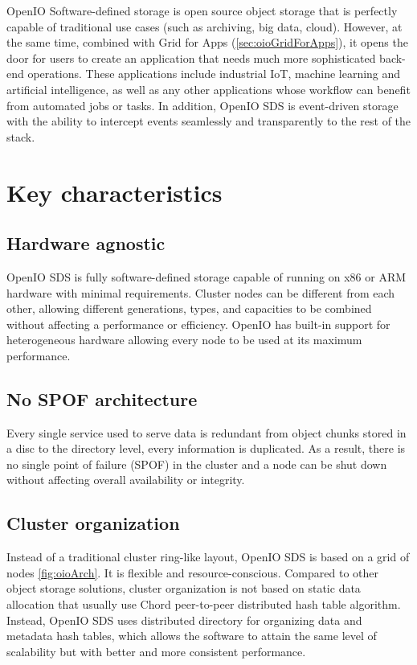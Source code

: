     OpenIO Software-defined storage is open source object storage that is perfectly capable of traditional use cases (such as archiving, big data, cloud). However, at the same time, combined with Grid for Apps (\ref{sec:oioGridForApps}), it opens the door for users to create an application that needs much more sophisticated back-end operations. These applications include industrial IoT, machine learning and artificial intelligence, as well as any other applications whose workflow can benefit from automated jobs or tasks\cite{oioNextGen}. In addition, OpenIO SDS is event-driven storage with the ability to intercept events seamlessly and transparently to the rest of the stack.

    \section{Key characteristics}
    \subsection*{Hardware agnostic}
    OpenIO SDS is fully software-defined storage capable of running on x86 or ARM hardware with minimal requirements. Cluster nodes can be different from each other, allowing different generations, types, and capacities to be combined without affecting a performance or efficiency\cite{oioKeyChars}.
    OpenIO has built-in support for heterogeneous hardware allowing every node to be used at its maximum performance.
    \subsection*{No SPOF architecture}
    Every single service used to serve data is redundant from object chunks stored in a disc to the directory level, every information is duplicated. As a result, there is no single point of failure (SPOF) in the cluster and a node can be shut down without affecting overall availability or integrity\cite{oioCoreSolution}.
    \subsection*{Cluster organization}
    Instead of a traditional cluster ring-like layout, OpenIO SDS is based on a grid of nodes \ref{fig:oioArch}. It is flexible and resource-conscious. Compared to other object storage solutions, cluster organization is not based on static data allocation that usually use Chord peer-to-peer distributed hash table algorithm. Instead, OpenIO SDS uses distributed directory for organizing data and metadata hash tables, which allows the software to attain the same level of scalability but with better and more consistent performance\cite{oioKeyChars}.

